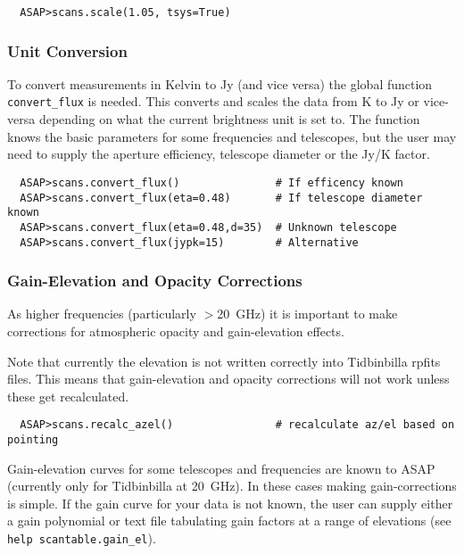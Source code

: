 \documentclass[11pt]{article}
\newcommand{\cmd}[1]{{\tt #1}}
\begin{document}
\begin{verbatim}
  ASAP>scans.scale(1.05, tsys=True)
\end{verbatim}

\subsubsection{Unit Conversion}

To convert measurements in Kelvin to Jy (and
vice versa) the global function \cmd{convert\_flux} is needed. This
converts and scales the data from K to Jy or vice-versa depending on
what the current brightness unit is set to. The function knows the
basic parameters for some frequencies and telescopes, but the user may
need to supply the aperture efficiency, telescope diameter or the Jy/K
factor.

\begin{verbatim}
  ASAP>scans.convert_flux()               # If efficency known
  ASAP>scans.convert_flux(eta=0.48)       # If telescope diameter known
  ASAP>scans.convert_flux(eta=0.48,d=35)  # Unknown telescope
  ASAP>scans.convert_flux(jypk=15)        # Alternative
\end{verbatim}

\subsubsection{Gain-Elevation and Opacity Corrections}
\label{sec:gainel}

As higher frequencies (particularly $>$20~GHz)
it is important to make corrections for atmospheric opacity and
gain-elevation effects.

Note that currently the elevation is not written correctly into
Tidbinbilla rpfits files. This means that gain-elevation and opacity
corrections will not work unless these get recalculated.

\begin{verbatim}
  ASAP>scans.recalc_azel()                # recalculate az/el based on pointing
\end{verbatim}

Gain-elevation curves for some telescopes and frequencies are known to
ASAP (currently only for Tidbinbilla at 20~GHz).  In these cases
making gain-corrections is simple.  If the gain curve for your data is
not known, the user can supply either a gain polynomial or text file
tabulating gain factors at a range of elevations (see \cmd{help
scantable.gain\_el}).
\end{document}
